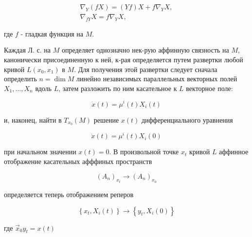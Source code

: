 \documentclass[10pt]{article}
\begin{document}
\[

\begin{gathered}

\nabla_{Y}(f X)=(Y f) X+f \nabla_{Y} X, \\

\nabla_{f Y} X=f \nabla_{Y} X,

\end{gathered}

\]



где $f$ - гладкая функция на $M$.



Каждая Л. с. на $M$ определяет однозначно нек-рую аффинную связность на $M$, канонически присоединенную к ней, к-рая определяется путем развертки любой кривой $L\left(x_{0}, x_{1}\right)$ в $M$. Для получения этой развертки следует сначала определить $n=\operatorname{dim} M$ линейно независимых параллельных векторных полей $X_{1}, \ldots, X_{n}$ вдоль $L$, затем разложить по ним касательное к $L$ векторное поле:



\[

\dot{x}(t)=\mu^{i}(t) X_{i}(t)

\]



и, наконец, найти в $T_{x_{0}}(M)$ решение $x(t)$ дифференциального уравнения



\[

\dot{x}(t)=\mu^{i}(t) X_{i}(0)

\]



при начальном значении $x(t)=0$. В произвольной точке $x_{t}$ кривой $L$ аффинное отображение касательных афффиных пространств



\[

\left(A_{n}\right)_{x_{t}} \longrightarrow\left(A_{n}\right)_{x_{0}}

\]



определяется теперь отображением реперов



\[

\left\{x_{t}, X_{i}(t)\right\} \longrightarrow\left\{y_{t}, X_{i}(0)\right\}

\]



где $\vec{x}_{0} y_{t}=x(t)$
\end{document}
